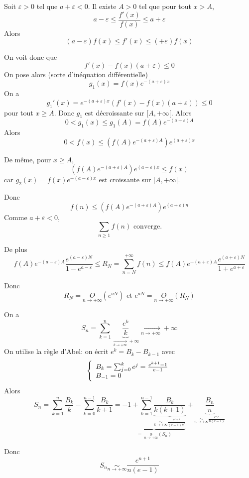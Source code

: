 \begin{solution}
	Soit $\varepsilon>0$ tel que $a+\varepsilon<0$. Il existe $A>0$ tel que pour tout $x>A$, 
	$$a-\varepsilon\leqslant\frac{f'(x)}{f(x)}\leqslant a+\varepsilon$$
	Alors
	$$(a-\varepsilon)f(x)\leqslant f'(x)\leqslant (+\varepsilon)f(x)$$

	On voit donc que 
	$$f'(x)-f(x)(a+\varepsilon)\leqslant0$$
	On pose alors (sorte d'inéquation différentielle) 
	$$g_{1}(x)=f(x)e^{-(a+\varepsilon)x}$$
	On a 
	$$g_{1}'(x)=e^{-(a+\varepsilon)x}\left(f'(x)-f(x)(a+\varepsilon)\right)\leqslant 0$$
	pour tout $x\geqslant A$. Donc $g_{1}$ est décroissante sur $[A,+\infty[$. Alors 
	$$0<g_{1}(x)\leqslant g_{1}(A)=f(A)e^{-(a+\varepsilon)A}$$
	Alors 
	$$0<f(x)\leqslant \left(f(A)e^{-(a+\varepsilon)A}\right)e^{(a+\varepsilon)x}$$

	De même, pour $x\geqslant A$, 
	$$\left(f(A)e^{-(a+\varepsilon)A}\right)e^{(a-\varepsilon)x}\leqslant f(x)$$
	car $g_{2}(x)=f(x)e^{-(a-\varepsilon)x}$ est croissante sur $[A,+\infty[$.

	Donc 
	$$f(n)\leqslant\left(f(A)e^{-(a+\varepsilon)A}\right)e^{(a+\varepsilon)n}$$
	Comme $a+\varepsilon<0$, 
	$$\boxed{\sum_{n\geqslant1}f(n)\text{ converge.}}$$
	
	De plus
	$$f(A)e^{-(a-\varepsilon)A}\frac{e^{(a-\varepsilon)N}}{1-e^{a-\varepsilon}}\leqslant R_{N}=\sum_{n=N}^{+\infty}f(n)\leqslant f(A)e^{-(a+\varepsilon)A}\frac{e^{(a+\varepsilon)N}}{1+e^{a+\varepsilon}}$$

	Donc 
	$$\boxed{R_{N}=\underset{n\to+\infty}{O}\left(e^{aN}\right)\text{ et }e^{aN}=\underset{n\to+\infty}{O}\left(R_{N}\right)}$$
\end{solution}

\begin{solution}
	On a 
	$$S_{n}=\sum_{k=1}^{n}\underbrace{\frac{e^{k}}{k}}_{\xrightarrow[k\to+\infty]{}+\infty}\xrightarrow[n\to+\infty]{}+\infty$$
	On utilise la règle d'Abel: on écrit $e^{k}=B_{k}-B_{k-1}$ avec 
	$$
	\left\{
		\begin{array}[]{ll}
			B_{k}=\sum_{j=0}^{k}e^{j}=\frac{e^{k+1}-1}{e-1}\\
			B_{-1}=0
		\end{array}	
	\right.
	$$
	Alors 
	$$S_{n}=\sum_{k=1}^{n}\frac{B_{k}}{k}-\sum_{k=0}^{n-1}\frac{B_{k}}{k+1}=\underbrace{-1+\sum_{k=1}^{n-1}\underbrace{\frac{B_{k}}{k(k+1)}}_{\underset{k\to+\infty}{\sim}\frac{e^{k+1}}{(e-1)k^{2}}}}_{=~\underset{n\to+\infty}{o}(S_{n})}+\underbrace{\frac{B_{n}}{n}}_{\underset{n\to+\infty}{\sim}\frac{e^{n}e}{n(e-1)}}$$

	Donc 
	$$\boxed{S_{n}\underset{n\to+\infty}{\sim}\frac{e^{n+1}}{n(e-1)}}$$
\end{solution}

